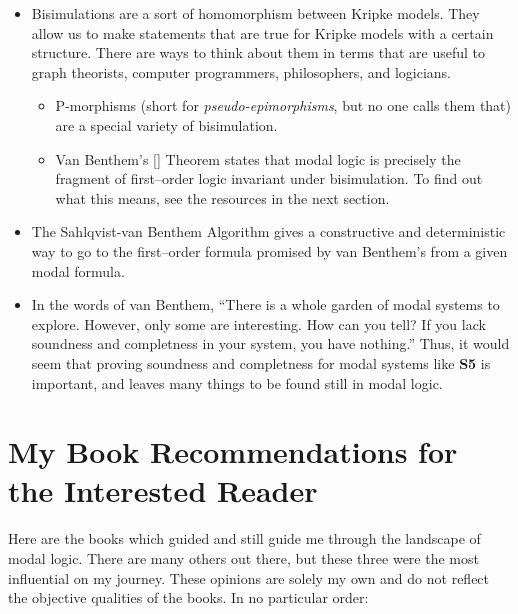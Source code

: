 \documentclass[12pt]{article}
\begin{document}
\begin{itemize}[noitemsep]
    \item Bisimulations are a sort of homomorphism between Kripke models. They allow us to make statements that are true for Kripke models 
    with a certain structure. There are ways to think about them in terms that are useful to graph theorists, computer programmers, philosophers, and
    logicians.
    \begin{itemize}[noitemsep]
        \item P-morphisms (short for \emph{pseudo-epimorphisms}, but no one calls them that) are a special variety of bisimulation.
        \item Van Benthem's [] Theorem states that modal logic is precisely the fragment of
        first--order logic invariant under bisimulation. To find out what this means, see the resources in the next section.
    \end{itemize}
    \item The Sahlqvist-van Benthem Algorithm gives a constructive and deterministic way to go to the first--order formula promised by van Benthem's
    from a given modal formula.
    \item In the words of van Benthem, ``There is a whole garden of modal systems to explore. However, only some are interesting. 
    How can you tell? If you lack soundness and completness in your system, you have nothing.'' Thus, it would seem that proving soundness and completness
    for modal systems like \textbf{S5} is important, and leaves many things to be found still in modal logic.
\end{itemize}

\section{My Book Recommendations for the Interested Reader}
Here are the books which guided and still guide me through the landscape of modal logic. There are many others out there, but these three
were the most influential on my journey. These opinions are solely my own and do not reflect the objective qualities of the books. In no particular order:
\end{document}
